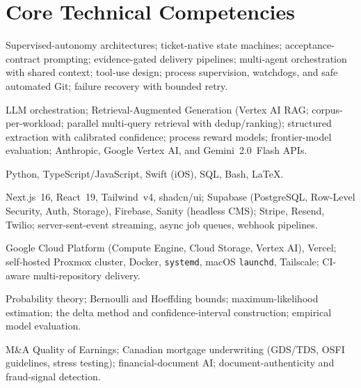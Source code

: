 \documentclass[11pt]{article}
\theoremstyle{plain}
\theoremstyle{definition}
\begin{document}
\section{Core Technical Competencies}
\noindent
\begin{description}[leftmargin=0pt, labelsep=0.5em, style=unboxed, itemsep=4pt]
  \item[\normalfont\textbf{Agentic systems (primary specialization).}] Supervised-autonomy
  architectures; ticket-native state machines; acceptance-contract prompting; evidence-gated
  delivery pipelines; multi-agent orchestration with shared context; tool-use design;
  process supervision, watchdogs, and safe automated Git; failure recovery with bounded
  retry.
  \item[\normalfont\textbf{Applied AI / LLMs.}] LLM orchestration; Retrieval-Augmented
  Generation (Vertex AI RAG; corpus-per-workload; parallel multi-query retrieval with
  dedup/ranking); structured extraction with calibrated confidence; process reward models;
  frontier-model evaluation; Anthropic, Google Vertex AI, and Gemini~2.0~Flash APIs.
  \item[\normalfont\textbf{Languages.}] Python, TypeScript/JavaScript, Swift (iOS), SQL,
  Bash, \LaTeX.
  \item[\normalfont\textbf{Full-stack.}] Next.js~16, React~19, Tailwind~v4, shadcn/ui;
  Supabase (PostgreSQL, Row-Level Security, Auth, Storage), Firebase, Sanity (headless CMS);
  Stripe, Resend, Twilio; server-sent-event streaming, async job queues, webhook pipelines.
  \item[\normalfont\textbf{Cloud \& infrastructure.}] Google Cloud Platform (Compute Engine,
  Cloud Storage, Vertex AI), Vercel; self-hosted Proxmox cluster, Docker, \texttt{systemd},
  macOS \texttt{launchd}, Tailscale; CI-aware multi-repository delivery.
  \item[\normalfont\textbf{Applied mathematics.}] Probability theory; Bernoulli and
  Hoeffding bounds; maximum-likelihood estimation; the delta method and confidence-interval
  construction; empirical model evaluation.
  \item[\normalfont\textbf{Financial domains.}] M\&A Quality of Earnings; Canadian mortgage
  underwriting (GDS/TDS, OSFI guidelines, stress testing); financial-document AI;
  document-authenticity and fraud-signal detection.
\end{description}

\end{document}
